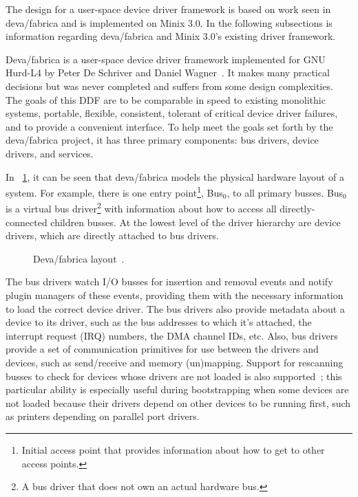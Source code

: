 
The design for a user-space device driver framework is based on work seen in
deva/fabrica and is implemented on Minix 3.0.  In the
following subsections is information regarding deva/fabrica and Minix 3.0's
existing driver framework.

\label{sec:deva_fabrica}

Deva/fabrica is a user-space device driver framework implemented
for GNU Hurd-L4 by Peter De Schriver and Daniel Wagner~\cite{hurdl4ref2003}.
It makes many practical decisions but was never completed and
suffers from some design complexities.  The goals of this DDF are to be
comparable in speed to existing monolithic systems, portable, flexible,
consistent, tolerant of critical device driver
failures, and to provide a convenient interface.  To help meet the goals set
forth by the deva/fabrica project, it has three primary components: bus
drivers, device drivers, and services.

In \figurename~\ref{fig:deva_layout}, it can be seen that deva/fabrica models
the physical hardware layout of a system.  For example, there is one entry
point\footnote{Initial access point that provides information about how
to get to other access points.}, Bus$_0$, to all primary busses.  Bus$_0$ is a
virtual bus driver\footnote{A bus driver that does not own an actual
hardware bus.} with information about how to access all directly-connected
children busses.  At the lowest level of the driver hierarchy are device
drivers, which are directly attached to bus drivers.

	\begin{figure}[tb]
	\begin{center}
	\end{center}
	\caption{Deva/fabrica layout~\cite{hurdl4ref2003}.}
	\label{fig:deva_layout}
	\end{figure}


The bus drivers watch I/O busses for insertion and removal events and notify
plugin managers of these events, providing them with the necessary information
to load the correct device driver.  The bus drivers also provide metadata
about a device to its driver, such as the bus addresses to which it's
attached, the interrupt request (IRQ) numbers, the DMA channel IDs, etc.
Also, bus drivers provide a set of communication primitives for use between
the drivers and devices, such as send/receive and memory (un)mapping.  Support
for rescanning busses to check for devices whose drivers are not loaded is also
supported~\cite{hurdl4ref2003}; this particular ability is especially useful
during bootstrapping when some devices are not loaded because their drivers
depend on other devices to be running first, such as printers depending on
parallel port drivers.  

